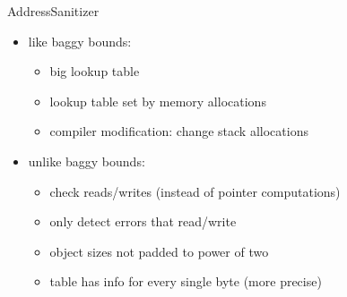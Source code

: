 
\begin{frame}{AddressSanitizer}
    \begin{itemize}
    \item like baggy bounds:
        \begin{itemize}
        \item big lookup table
        \item lookup table set by memory allocations
        \item compiler modification: change stack allocations
        \end{itemize}
    \item unlike baggy bounds:
        \begin{itemize}
        \item check reads/writes (instead of pointer computations)
        \item only detect errors that read/write 
        \item object sizes not padded to power of two
        \item table has info for every single byte (more precise)
        \end{itemize}
    \end{itemize}
\end{frame}


